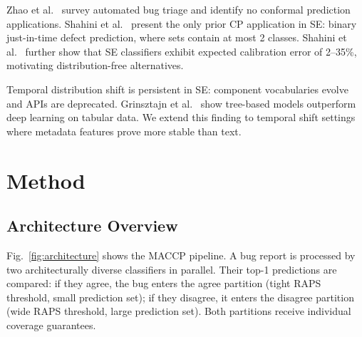 \documentclass[conference]{IEEEtran}
\begin{document}
Zhao et al.~\cite{zhao2025triage} survey automated bug triage and identify no conformal prediction applications. Shahini et al.~\cite{shahini2024conformal} present the only prior CP application in SE: binary just-in-time defect prediction, where sets contain at most 2 classes. Shahini et al.~\cite{shahini2025miscalibrated} further show that SE classifiers exhibit expected calibration error of 2--35\%, motivating distribution-free alternatives.

Temporal distribution shift is persistent in SE: component vocabularies evolve and APIs are deprecated. Grinsztajn et al.~\cite{grinsztajn2022tree} show tree-based models outperform deep learning on tabular data. We extend this finding to temporal shift settings where metadata features prove more stable than text.

\section{Method}\label{sec:method}

\subsection{Architecture Overview}

Fig.~\ref{fig:architecture} shows the MACCP pipeline. A bug report is processed by two architecturally diverse classifiers in parallel. Their top-1 predictions are compared: if they agree, the bug enters the agree partition (tight RAPS threshold, small prediction set); if they disagree, it enters the disagree partition (wide RAPS threshold, large prediction set). Both partitions receive individual coverage guarantees.
\end{document}
